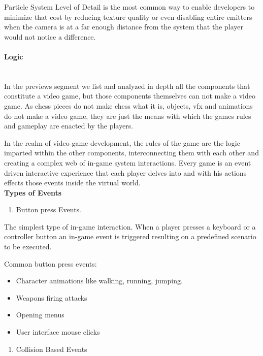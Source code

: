 \documentclass[a4paper,one side,12pt]{book}
\begin{document}
Particle System Level of Detail is the most common way to enable
developers to minimize that cost by reducing texture quality or even
disabling entire emitters when the camera is at a far enough distance
from the system that the player would not notice a difference.


\paragraph{Logic\\\\}

In the previews segment we list and analyzed in depth all the components
that constitute a video game, but those components themselves can not
make a video game. As chess pieces do not make chess what it is,
objects, vfx and animations do not make a video game, they are just the means with which the games rules and gameplay are enacted by the
players.

In the realm of video game development, the rules of the game are the
logic imparted within the other components, interconnecting them with
each other and creating a complex web of in-game system interactions.
Every game is an event driven interactive experience that each player
delves into and with his actions effects those events inside the virtual world.\\

\textbf{Types of Events}

\begin{enumerate}
\def\labelenumi{\arabic{enumi}.}
\item
  {Button press Events.}
\end{enumerate}

The simplest type of in-game interaction. When a player presses a
keyboard or a controller button an in-game event is triggered resulting
on a predefined scenario to be executed.

Common button press events:

\begin{itemize}
\item
  Character animations like walking, running, jumping.
\item
  Weapons firing attacks
\item
  Opening menus
\item
  User interface mouse clicks
\end{itemize}

\begin{enumerate}
\def\labelenumi{\arabic{enumi}.}
\setcounter{enumi}{1}
\item
  {Collision Based Events}
\end{enumerate}
\end{document}

